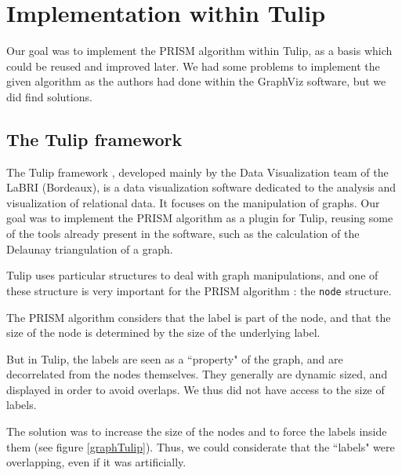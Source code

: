 \documentclass[12pt]{report}
\begin{document}
\chapter{Implementation within Tulip}

Our goal was to implement the PRISM algorithm within Tulip, as a basis which could be reused and improved later. We had some problems to implement the given algorithm as the authors had done within the GraphViz \cite{Gansner02} software, but we did find solutions.

\section{The Tulip framework}

The Tulip framework \cite{Auber12}, developed mainly by the Data Visualization team of the LaBRI (Bordeaux), is a data visualization software dedicated to the analysis and visualization of relational data. It focuses on the manipulation of graphs. Our goal was to implement the PRISM algorithm as a plugin for Tulip, reusing some of the tools already present in the software, such as the calculation of the Delaunay triangulation of a graph.

Tulip uses particular structures to deal with graph manipulations, and one of these structure is very important for the PRISM algorithm : the \texttt{node} structure.

The PRISM algorithm considers that the label is part of the node, and that the size of the node is determined by the size of the underlying label.

But in Tulip, the labels are seen as a ``property" of the graph, and are decorrelated from the nodes themselves. They generally are dynamic sized, and displayed in order to avoid overlaps. We thus did not have access to the size of labels.

The solution was to increase the size of the nodes and to force the labels inside them (see figure \ref{graphTulip}). Thus, we could considerate that the ``labels" were overlapping, even if it was artificially.
\end{document}
